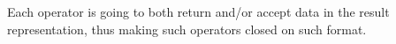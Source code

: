 
Each \xLTLf operator is going to both return and/or accept data in the result representation, thus making such operators closed on such format.







